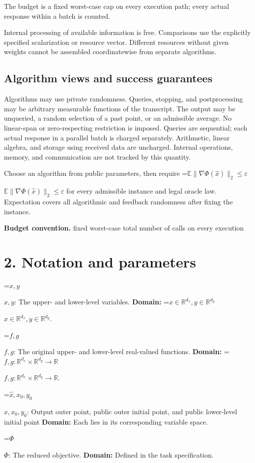 \documentclass[10pt,a4paper]{article}
\newcommand{\AtlasMath}[1]{\par\begingroup\centering\setbox0=\hbox{$\displaystyle #1$}\ifdim\wd0>1.4\linewidth\typeout{ATLAS WIDE FORMULA: \the\wd0}\fi\ifdim\wd0>\linewidth\resizebox{\linewidth}{!}{\box0}\else\box0\fi\par\endgroup}
\newcommand{\AtlasInlineMath}[1]{\begingroup\setbox0=\hbox{$#1$}\ifdim\wd0>.4\linewidth\endgroup\AtlasMath{#1}\else\endgroup$#1$\fi}
\begin{document}
The budget is a fixed worst-case cap on every execution path; every actual response within a batch is counted.

Internal processing of available information is free. Comparisons use the explicitly specified scalarization or resource vector. Different resources without given weights cannot be assembled coordinatewise from separate algorithms.

\subsection{Algorithm views and success guarantees}
Algorithms may use private randomness. Queries, stopping, and postprocessing may be arbitrary measurable functions of the transcript. The output may be unqueried, a random selection of a past point, or an admissible average. No linear-span or zero-respecting restriction is imposed. Queries are sequential; each actual response in a parallel batch is charged separately. Arithmetic, linear algebra, and storage using received data are uncharged. Internal operations, memory, and communication are not tracked by this quantity.

Choose an algorithm from public parameters, then require \AtlasInlineMath{\mathbb{E}\|\nabla\Phi(\widehat{x})\|_2\le\varepsilon} for every admissible instance and legal oracle law. Expectation covers all algorithmic and feedback randomness after fixing the instance.

\textbf{Budget convention.} fixed worst-case total number of calls on every execution

\section{2. Notation and parameters}
\AtlasInlineMath{x,y}: The upper- and lower-level variables. \textbf{Domain:} \AtlasInlineMath{x\in\mathbb R^{d_x},y\in\mathbb R^{d_y}}.

\AtlasInlineMath{f,g}: The original upper- and lower-level real-valued functions. \textbf{Domain:} \AtlasInlineMath{f,g:\mathbb R^{d_x}\times\mathbb R^{d_y}\to\mathbb R}.

\AtlasInlineMath{\widehat x,x_0,y_0}: Output outer point, public outer initial point, and public lower-level initial point \textbf{Domain:} Each lies in its corresponding variable space.

\AtlasInlineMath{\Phi}: The reduced objective. \textbf{Domain:} Defined in the task specification.
\end{document}
